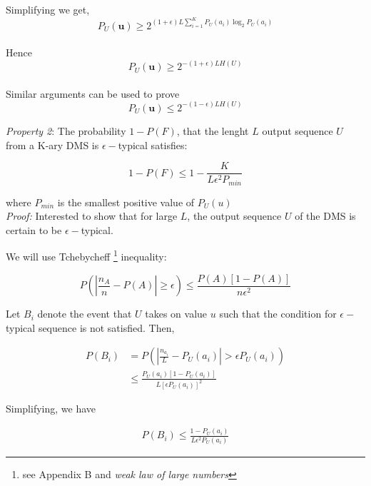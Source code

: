 \documentclass[11pt]{article}
\begin{document}
Simplifying we get,
\begin{equation}
P_{U}(\textbf{u}) \geq 2^{(1+\epsilon) L \sum\limits_{i=1}^KP_{U}(a_{i})\log_{2}P_{U}(a_{i})}
\end{equation}
\\

Hence
\begin{equation}
P_{U}(\textbf{u}) \geq 2^{-(1+\epsilon)LH(U)}
\end{equation}
\\

Similar arguments can be used to prove
\begin{equation}
P_{U}(\textbf{u}) \leq 2^{-(1-\epsilon)LH(U)}
\end{equation}


\textit{Property 2}: The probability $1 - P(F)$, that the lenght $L$ output sequence $U$ from a K-ary DMS is $\epsilon-$typical satisfies:

\begin{equation}
1 - P(F) \leq 1 - \frac{K}{L\epsilon^{2}P_{min}}
\end{equation}

where $P_{min}$ is the smallest positive value of $P_{U}(u)$ \\

\textit{Proof:} Interested to show that for large $L$, the output sequence $U$ of the DMS is certain to be $\epsilon-$typical.

We will use Tchebycheff \footnote{see Appendix B and \textit{weak law of large numbers}} inequality: 

\begin{equation}
P(|\frac{n_{A}}{n} - P(A)| \geq \epsilon) \leq \frac{P(A)[1-P(A)]}{n\epsilon^2}
\end{equation}

Let $B_{i}$ denote the event that $U$ takes on value $u$ such that the condition for $\epsilon-$typical sequence is not satisfied. Then,

\begin{equation}
\begin{split}
P(B_i) &= P(|\frac{n_{a_{i}}}{L} - P_{U}(a_i)| > \epsilon P_{U}(a_i)) \\
& \leq \frac{P_{U}(a_i)[1 - P_{U}(a_i)]}{L[\epsilon P_{U}(a_i)]^2}
\end{split}
\end{equation}

Simplifying, we have

\begin{equation}
\begin{split}
P(B_i) \leq \frac{1 - P_{U}(a_i)}{L \epsilon^{2}P_U(a_i)}
\end{split}
\end{equation}
\end{document}

